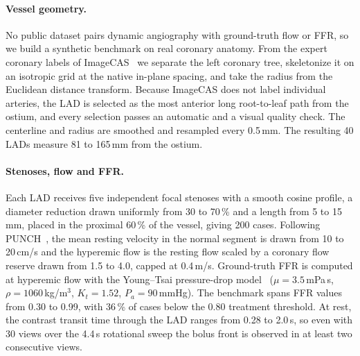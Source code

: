 
\paragraph{Vessel geometry.}
No public dataset pairs dynamic angiography with ground-truth flow or FFR,
so we build a synthetic benchmark on real coronary anatomy. From the
expert coronary labels of ImageCAS~\cite{zeng2023imagecas} we separate the
left coronary tree, skeletonize it on an isotropic grid at the native
in-plane spacing, and take the radius from the Euclidean distance
transform. Because ImageCAS does not label individual arteries, the LAD is
selected as the most anterior long root-to-leaf path from the ostium, and
every selection passes an automatic and a visual quality check. The
centerline and radius are smoothed and resampled every 0.5\,mm. The
resulting 40 LADs measure 81 to 165\,mm from the ostium.

\paragraph{Stenoses, flow and FFR.}
Each LAD receives five independent focal stenoses with a smooth cosine
profile, a diameter reduction drawn uniformly from 30 to 70\,\% and a
length from 5 to 15\,mm, placed in the proximal 60\,\% of the vessel,
giving 200 cases. Following PUNCH~\cite{thakur2026punch}, the mean resting
velocity in the normal segment is drawn from 10 to 20\,cm/s and the
hyperemic flow is the resting flow scaled by a coronary flow reserve drawn
from 1.5 to 4.0, capped at 0.4\,m/s. Ground-truth FFR is computed at
hyperemic flow with the Young--Tsai pressure-drop model~\cite{young1973flow}
($\mu = 3.5$\,mPa\,s, $\rho = 1060$\,kg/m$^3$, $K_t = 1.52$,
$P_a = 90$\,mmHg). The benchmark spans FFR values from 0.30 to 0.99, with
36\,\% of cases below the 0.80 treatment threshold. At rest, the contrast
transit time through the LAD ranges from 0.28 to 2.0\,s, so even with 30
views over the 4.4\,s rotational sweep the bolus front is observed in at
least two consecutive views.

